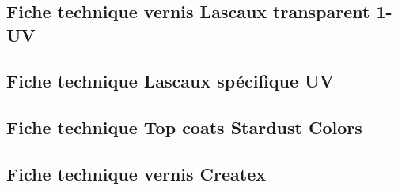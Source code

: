 
\chapter{}
\newpage

\section[Fiche technique vernis Lascaux]{Fiche technique vernis Lascaux transparent 1-UV}\label{fiche_technique_Lascaux}

\begin{figure}[H]
    \centering
    
\end{figure}


\section[Fiche technique Lascaux spécifique UV]{Fiche technique Lascaux spécifique UV}\label{fiche_technique_Lascaux_UV}

\begin{figure}[H]
    \centering
    
\end{figure}



\section[Fiche technique Stardust Colors]{Fiche technique Top coats Stardust Colors}\label{fiche_technique_Stardust}

\begin{figure}[H]
    \centering
    
\end{figure}


\newpage
\section[Fiche technique vernis Createx]{Fiche technique vernis Createx}\label{fiche_technique_Createx}

